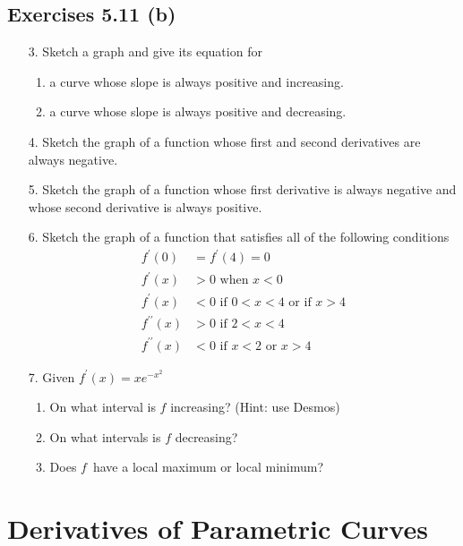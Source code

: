 \subsection{Exercises 5.11 (b)}
\begin{enumerate}
\item [3.] Sketch a graph and give its equation for 


\begin{enumerate}
\item a curve whose slope is always positive and increasing. 

\item a
curve whose slope is always positive and decreasing. \end{enumerate}


\item [4.]
Sketch the graph of a function whose first and second derivatives are always negative. 

\item [5.]
Sketch the graph of a function whose first derivative is always negative and whose second derivative is always positive. 

\item [6.]
Sketch the graph of a function that satisfies all of the following conditions
\begin{align*}f^{ \prime } (0) &  = f^{ \prime } (4) =0 \\
f^{ \prime } (x) &  >  0\text{ when }x <0 \\
f^{ \prime } (x) &  < 0\text { if }0 <x <4\text{ or if }x >4 \\
f^{ \prime  \prime } (x) &  >  0\text{ if }2 <x <4 \\
f^{ \prime  \prime } (x) &  <  0\text{ if }x <2\text{ or }x >4\end{align*}

\item [7.] Given $f^{ \prime } (x) =x e^{ -x^{2}}$ 


\begin{enumerate}
\item On what interval is $f$ increasing? (Hint: use Desmos) 

\item On what intervals is $f$ decreasing? 

\item Does $f$\ have a local maximum or local minimum? \end{enumerate}
\end{enumerate}


\section{Derivatives of Parametric Curves}


